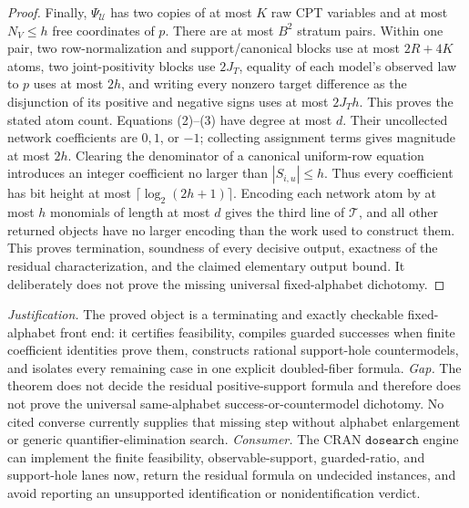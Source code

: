 \documentclass{article}
\begin{document}
\begin{proof}
Finally, \(\Psi_{\mathcal U}\) has two copies of at most \(K\) raw CPT variables and at most \(N_V\le h\) free coordinates of \(p\). There are at most \(B^2\) stratum pairs. Within one pair, two row-normalization and support/canonical blocks use at most \(2R+4K\) atoms, two joint-positivity blocks use \(2J_T\), equality of each model's observed law to \(p\) uses at most \(2h\), and writing every nonzero target difference as the disjunction of its positive and negative signs uses at most \(2J_Th\). This proves the stated atom count. Equations (2)--(3) have degree at most \(d\). Their uncollected network coefficients are \(0,1\), or \(-1\); collecting assignment terms gives magnitude at most \(2h\). Clearing the denominator of a canonical uniform-row equation introduces an integer coefficient no larger than \(|S_{i,u}|\le h\). Thus every coefficient has bit height at most \(\lceil\log_2(2h+1)\rceil\). Encoding each network atom by at most \(h\) monomials of length at most \(d\) gives the third line of \(\mathcal T\), and all other returned objects have no larger encoding than the work used to construct them. This proves termination, soundness of every decisive output, exactness of the residual characterization, and the claimed elementary output bound. It deliberately does not prove the missing universal fixed-alphabet dichotomy.
\end{proof}
\par\smallskip\noindent \textit{Justification.} The proved object is a terminating and exactly checkable fixed-alphabet front end: it certifies feasibility, compiles guarded successes when finite coefficient identities prove them, constructs rational support-hole countermodels, and isolates every remaining case in one explicit doubled-fiber formula. \textit{Gap.} The theorem does not decide the residual positive-support formula and therefore does not prove the universal same-alphabet success-or-countermodel dichotomy. No cited converse currently supplies that missing step without alphabet enlargement or generic quantifier-elimination search. \textit{Consumer.} The CRAN \(\texttt{dosearch}\) engine can implement the finite feasibility, observable-support, guarded-ratio, and support-hole lanes now, return the residual formula on undecided instances, and avoid reporting an unsupported identification or nonidentification verdict.
\end{document}
